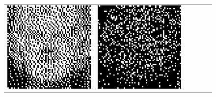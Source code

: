 \begin{figure}
\begin{tabular}{c c c c c c}
		\includegraphics[width=\tilewidth,interpolate=false]{media/chp2/associative_memory/binam/06_00_orig_scaled_crushed.png}&%
		\includegraphics[width=\tilewidth,interpolate=false]{media/chp2/associative_memory/binam/06_01_noise_scaled_crushed.png}&%

\end{tabular}
\end{figure}
